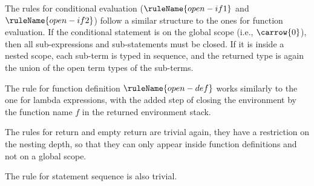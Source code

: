 The rules for conditional evaluation ($\ruleName{open-if1}$ and $\ruleName{open-if2}$) follow a similar structure to the ones for
function evaluation. If the conditional statement is on the global scope (i.e., $\carrow{0}$), then all sub-expressions
and sub-statements must be closed. If it is inside a nested scope, each sub-term is typed in sequence, and the
returned type is again the union of the open term types of the sub-terms.  

The rule for function definition $\ruleName{open-def}$ works similarly to the one for lambda expressions, with the added step of
closing the environment by the function name $f$ in the returned environment stack.

The rules for return and empty return are trivial again, they have a restriction on the nesting depth, so that they can only
appear inside function definitions and not on a global scope.

The rule for statement sequence is also trivial.



